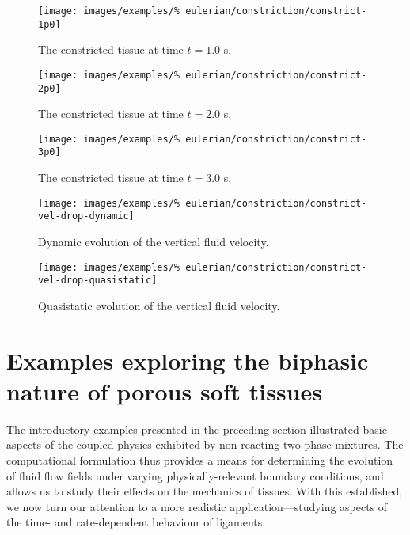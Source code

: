 \begin{figure}[!hptb]
  \centering
  \texttt{[image: images/examples/\%
    eulerian/constriction/constrict-1p0]}
  \caption{The constricted tissue at time $t=1.0$ s.} 
  \label{constrict-image-1p0}
\end{figure}

\begin{figure}[!hptb]
  \centering
  \texttt{[image: images/examples/\%
    eulerian/constriction/constrict-2p0]}
  \caption{The constricted tissue at time $t=2.0$ s.} 
  \label{constrict-image-2p0}
\end{figure}

\begin{figure}[!hptb]
  \centering
  \texttt{[image: images/examples/\%
    eulerian/constriction/constrict-3p0]}
  \caption{The constricted tissue at time $t=3.0$ s.} 
  \label{constrict-image-3p0}
\end{figure}

\begin{figure}[!hptb]
  \centering
  \texttt{[image: images/examples/\%
    eulerian/constriction/constrict-vel-drop-dynamic]}
  \caption{Dynamic evolution of the vertical fluid velocity.}
  \label{velocity-evolution-dynamic}
\end{figure}

\begin{figure}[!hptb]
  \centering
  \texttt{[image: images/examples/\%
    eulerian/constriction/constrict-vel-drop-quasistatic]}
  \caption{Quasistatic evolution of the vertical fluid velocity.}
  \label{velocity-evolution-quasistatic}
\end{figure}

\clearpage

\section{Examples exploring the biphasic nature of porous soft
  tissues}
\label{biphasic-examples-2}

The introductory examples presented in the preceding section
illustrated basic aspects of the coupled physics exhibited by
non-reacting two-phase mixtures. The computational formulation thus
provides a means for determining the evolution of fluid flow fields
under varying physically-relevant boundary conditions, and allows us
to study their effects on the mechanics of tissues. With this
established, we now turn our attention to a more realistic
application---studying aspects of the time- and rate-dependent
behaviour of ligaments.

